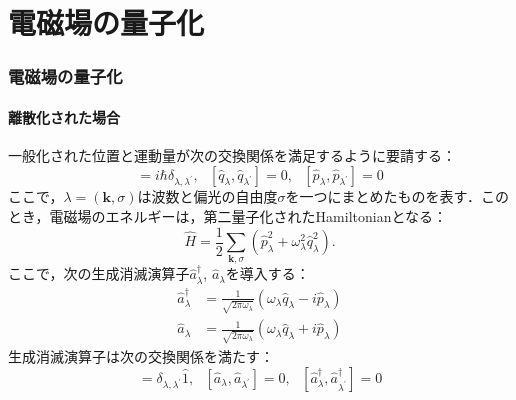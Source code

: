 
\part{電磁場の量子化}
\section{電磁場の量子化}
\subsection{離散化された場合}
一般化された位置と運動量が次の交換関係を満足するように要請する：
\begin{equation}
    [\hat{q}_{\lambda}, \hat{p}_{\lambda^\prime}] = i\hbar\delta_{\lambda,\lambda^\prime},\ \ \
    [\hat{q}_{\lambda}, \hat{q}_{\lambda^\prime}] = 0,\ \ \ 
    [\hat{p}_{\lambda}, \hat{p}_{\lambda^\prime}] = 0
\end{equation}
ここで，$\lambda=(\bm{k},\sigma)$は波数と偏光の自由度$\sigma$を一つにまとめたものを表す．このとき，電磁場のエネルギーは，第二量子化されたHamiltonianとなる：
\begin{equation}\label{elmg_Hamiltonian}
    \hat{H} = \frac{1}{2}\sum_{\bm{k},\sigma} (\hat{p}_{\lambda}^2 + \omega_{\lambda}^2 \hat{q}_{\lambda}^2).
\end{equation}
ここで，次の生成消滅演算子$\hat{a}^{\dag}_{\lambda}$, $\hat{a}_{\lambda}$を導入する：
\begin{align}
    \hat{a}^{\dag}_{\lambda} &= \frac{1}{\sqrt{2\pi\omega_{\lambda}}}
    (\omega_{\lambda} \hat{q}_{\lambda}-i\hat{p}_{\lambda})\\[10pt]
    \hat{a}_{\lambda} &= \frac{1}{\sqrt{2\pi\omega_{\lambda}}}
    (\omega_{\lambda} \hat{q}_{\lambda}+i\hat{p}_{\lambda})
\end{align}
生成消滅演算子は次の交換関係を満たす：
\begin{equation}
    [\hat{a}_{\lambda}, \hat{a}^{\dag}_{\lambda}] = \delta_{\lambda,\lambda^\prime}\hat{1},\ \ \
    [\hat{a}_{\lambda}, \hat{a}_{\lambda^\prime}] = 0,\ \ \ 
    [\hat{a}^{\dag}_{\lambda}, \hat{a}^{\dag}_{\lambda^\prime}] = 0
\end{equation}

